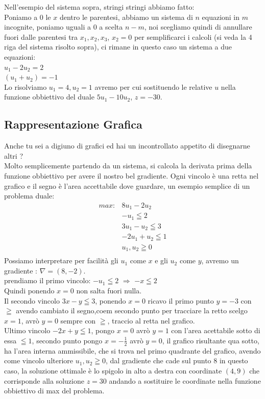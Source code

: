 \documentclass{article}
\begin{document}
Nell'esempio del sistema sopra, stringi stringi abbiamo fatto:\\
Poniamo a $0$ le $x$ dentro le parentesi, abbiamo un sistema di $n$ equazioni in $m$ incognite, poniamo uguali a $0$ a scelta $n-m$, noi scegliamo quindi di annullare fuori dalle parentesi tra $x_1,x_2,x_3$, $x_2=0$ per semplificarci i calcoli (si veda la 4 riga del sistema risolto sopra), ci rimane in questo caso un sistema a due equazioni:\\
$u_1 - 2u_2 = 2$\\
$(u_1 + u_2) = -1$\\
Lo risolviamo $u_1 = 4, u_2 = 1$ avremo per cui sostituendo le relative $u$ nella funzione obbiettivo del duale $5u_1 - 10u_2$, $z = -30$.
\subsection{Rappresentazione Grafica}
Anche tu sei a digiuno di grafici ed hai un incontrollato appetito di disegnarne altri ?\\
Molto semplicemente partendo da un sistema, si calcola la derivata prima della funzione obbiettivo per avere il nostro bel gradiente.
Ogni vincolo è una retta nel grafico e il segno è l'area accettabile dove guardare, un esempio semplice di un problema duale:\\
\begin{align*}
max: &8u_1 - 2u_2 \\
&-u_1 \leqq 2  \\
&3u_1 - u_2 \leqq 3   \\
&-2u_1 + u_2 \leqq 1   \\
&u_1, u_2 \geqq 0 \\
\end{align*}
Possiamo interpretare per facilità gli $u_1$ come $x$ e gli $u_2$ come $y$, avremo un gradiente : $\nabla = (8,-2)$.\\
prendiamo il primo vincolo: $-u_1 \leqq 2$ $\Rightarrow$ $-x \leqq 2$\\
Quindi ponendo $x=0$ non salta fuori nulla.\\
Il secondo vincolo $3x -y \leqq 3$, ponendo $x=0$ ricavo il primo punto $y= -3$
con $\geqq $ avendo cambiato il segno,coem secondo punto per tracciare la retto scelgo $x=1$, avrò $y=0$ sempre con $\geqq $, traccio al retta nel grafico.\\
Ultimo vincolo $-2x +y \leqq 1$, pongo $x=0$ avrò $y = 1$ con l'area acettabile sotto di essa $\leqq 1$, secondo punto pongo $x=-\frac{1}{2}$ avrò $y=0$, il grafico risultante qua sotto, ha l'area interna ammissibile, che si trova nel primo quadrante del grafico, avendo come vincolo ulteriore $u_1,u_2 \geqq 0$, dal gradiente che cade sul punto 8 in questo caso, la soluzione ottimale è lo spigolo in alto a destra con coordinate $(4,9)$ che corrisponde alla soluzione $z = 30$ andando a sostituire le coordinate nella funzione obbiettivo di max del problema.
\end{document}
